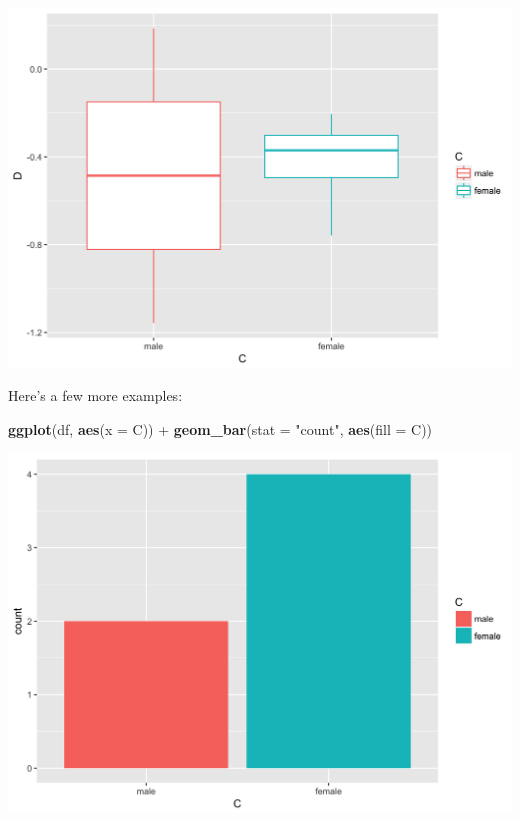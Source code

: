 \documentclass[]{tufte-book}
\newenvironment{Shaded}{}{}
\newcommand{\KeywordTok}[1]{\textcolor[rgb]{0.00,0.44,0.13}{\textbf{#1}}}
\newcommand{\DataTypeTok}[1]{\textcolor[rgb]{0.56,0.13,0.00}{#1}}
\newcommand{\StringTok}[1]{\textcolor[rgb]{0.25,0.44,0.63}{#1}}
\newcommand{\OperatorTok}[1]{\textcolor[rgb]{0.40,0.40,0.40}{#1}}
\newcommand{\NormalTok}[1]{#1}
\theoremstyle{definition}
\theoremstyle{definition}
\theoremstyle{remark}
\begin{document}
\includegraphics{_main_files/figure-latex/unnamed-chunk-58-1}

Here's a few more examples:

\begin{Shaded}
\begin{Highlighting}[]
\KeywordTok{ggplot}\NormalTok{(df, }\KeywordTok{aes}\NormalTok{(}\DataTypeTok{x =}\NormalTok{ C)) }\OperatorTok{+}\StringTok{ }\KeywordTok{geom_bar}\NormalTok{(}\DataTypeTok{stat =} \StringTok{"count"}\NormalTok{, }
    \KeywordTok{aes}\NormalTok{(}\DataTypeTok{fill =}\NormalTok{ C))}
\end{Highlighting}
\end{Shaded}

\includegraphics{_main_files/figure-latex/unnamed-chunk-59-1}
\end{document}
